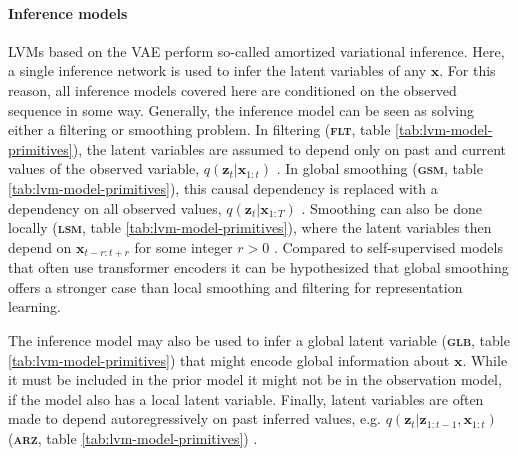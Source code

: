 

\paragraph{Inference models} 
LVMs based on the VAE perform so-called amortized variational inference. Here, a single inference network is used to infer the latent variables of any $\mathbf{x}$. 
For this reason, all inference models covered here are conditioned on the observed sequence in some way. Generally, the inference model can be seen as solving either a filtering or smoothing problem.
In filtering (\textbf{\textsc{flt}}, table \ref{tab:lvm-model-primitives}), the latent variables are assumed to depend only on past and current values of the observed variable, $q(\mathbf{z}_t|\mathbf{x}_{1:t})$ \cite{chung_recurrent_2015, khurana_convolutional_2020}. In global smoothing (\textbf{\textsc{gsm}}, table \ref{tab:lvm-model-primitives}), this causal dependency is replaced with a dependency on all observed values, $q(\mathbf{z}_t|\mathbf{x}_{1:T})$ \cite{fraccaro_sequential_2016, hsu_learning_2017}. 
Smoothing can also be done locally (\textbf{\textsc{lsm}}, table \ref{tab:lvm-model-primitives}), where the latent variables then depend on $\mathbf{x}_{t-r:t+r}$ for some integer $r>0$ \cite{oord_neural_2018}. Compared to self-supervised models that often use transformer encoders it can be hypothesized that global smoothing offers a stronger case than local smoothing and filtering for representation learning.

The inference model may also be used to infer a global latent variable (\textbf{\textsc{glb}}, table \ref{tab:lvm-model-primitives}) that might encode global information about $\mathbf{x}$. 
While it must be included in the prior model it might not be in the observation model, if the model also has a local latent variable. 
Finally, latent variables are often made to depend autoregressively on past inferred values, e.g. $q(\mathbf{z}_t|\mathbf{z}_{1:t-1},\mathbf{x}_{1:t})$ (\textbf{\textsc{arz}}, table \ref{tab:lvm-model-primitives}) \cite{chung_recurrent_2015, fraccaro_sequential_2016}.


